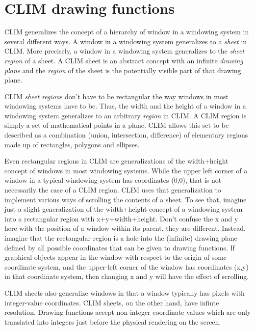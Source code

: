 \chapter{CLIM drawing functions}

CLIM generalizes the concept of a hierarchy of window in a windowing
system in several different ways.  A window in a windowing system
generalizes to a \emph{sheet} in CLIM.  More precisely, a window in a
windowing system generalizes to the \emph{sheet region} of a sheet.  A
CLIM sheet is an abstract concept with an infinite \emph{drawing plane}
and the \emph{region} of the sheet is the potentially visible part of
that drawing plane.

CLIM \emph{sheet region}s don't have to be rectangular the way windows
in most windowing systems have to be.  Thus, the width and the height of
a window in a windowing system generalizes to an arbitrary
\emph{region} in CLIM.  A CLIM region is simply a set of mathematical
points in a plane.  CLIM allows this set to be described as a
combination (union, intersection, difference) of elementary regions made
up of rectangles, polygons and ellipses.

Even rectangular regions in CLIM are generalizations of the width+height
concept of windows in most windowing systems.  While the upper left
corner of a window in a typical windowing system has coordinates (0,0),
that is not necessarily the case of a CLIM region.  CLIM uses that
generalization to implement various ways of scrolling the contents of a
sheet.  To see that, imagine just a slight generalization of the
width+height concept of a windowing system into a rectangular region
with x+y+width+height.  Don't confuse the x and y here with the position
of a window within its parent, they are different.  Instead, imagine
that the rectangular region is a hole into the (infinite) drawing plane
defined by all possible coordinates that can be given to drawing
functions.  If graphical objects appear in the window with respect to
the origin of some coordinate system, and the upper-left corner of the
window has coordinates (x,y) in that coordinate system, then changing x
and y will have the effect of scrolling.

CLIM sheets also generalize windows in that a window typically has
pixels with integer-value coordinates.  CLIM sheets, on the other hand,
have infinte resolution.  Drawing functions accept non-integer
coordinate values which are only translated into integers just before
the physical rendering on the screen.

